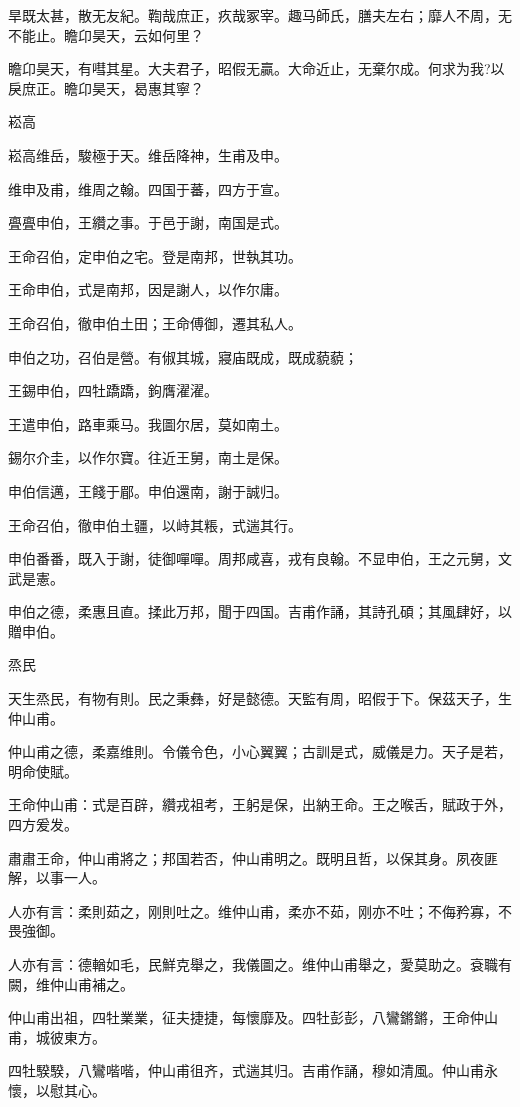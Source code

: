旱既太甚，散无友紀。鞫哉庶正，疚哉冢宰。趣马師氏，膳夫左右；靡人不周，无不能止。瞻卬昊天，云如何里？

瞻卬昊天，有嘒其星。大夫君子，昭假无贏。大命近止，无棄尔成。何求为我?以戾庶正。瞻卬昊天，曷惠其寧？

崧高

崧高维岳，駿極于天。维岳降神，生甫及申。

维申及甫，维周之翰。四国于蕃，四方于宣。

亹亹申伯，王纘之事。于邑于謝，南国是式。

王命召伯，定申伯之宅。登是南邦，世執其功。

王命申伯，式是南邦，因是謝人，以作尔庸。

王命召伯，徹申伯土田；王命傅御，遷其私人。

申伯之功，召伯是營。有俶其城，寢庙既成，既成藐藐；

王錫申伯，四牡蹻蹻，鉤膺濯濯。

王遣申伯，路車乘马。我圖尔居，莫如南土。

錫尔介圭，以作尔寶。往近王舅，南土是保。

申伯信邁，王餞于郿。申伯還南，謝于誠归。

王命召伯，徹申伯土疆，以峙其粻，式遄其行。

申伯番番，既入于謝，徒御嘽嘽。周邦咸喜，戎有良翰。不显申伯，王之元舅，文武是憲。

申伯之德，柔惠且直。揉此万邦，聞于四国。吉甫作誦，其詩孔碩；其風肆好，以贈申伯。

烝民

天生烝民，有物有則。民之秉彝，好是懿德。天監有周，昭假于下。保茲天子，生仲山甫。

仲山甫之德，柔嘉维則。令儀令色，小心翼翼；古訓是式，威儀是力。天子是若，明命使賦。

王命仲山甫：式是百辟，纘戎祖考，王躬是保，出納王命。王之喉舌，賦政于外，四方爰发。

肅肅王命，仲山甫將之；邦国若否，仲山甫明之。既明且哲，以保其身。夙夜匪解，以事一人。

人亦有言：柔則茹之，刚則吐之。维仲山甫，柔亦不茹，刚亦不吐；不侮矜寡，不畏強御。

人亦有言：德輶如毛，民鮮克舉之，我儀圖之。维仲山甫舉之，愛莫助之。袞職有闕，维仲山甫補之。

仲山甫出祖，四牡業業，征夫捷捷，每懷靡及。四牡彭彭，八鸞鏘鏘，王命仲山甫，城彼東方。

四牡騤騤，八鸞喈喈，仲山甫徂齐，式遄其归。吉甫作誦，穆如清風。仲山甫永懷，以慰其心。

